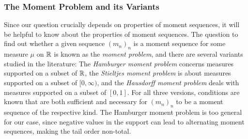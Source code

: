 \documentclass[a4paper]{scrreprt}
\begin{document}
    \subsubsection{The Moment Problem and its Variants}
    Since our question crucially depends on properties of moment sequences, it will be helpful to know about the properties of moment sequences.
    The question to find out whether a given sequence $(m_n)_n$ is a moment sequence for some measure $\mu$ on $\mathbb{R}$ is known as the \emph{moment problem}, and there are several variants studied in the literature:
    The \emph{Hamburger moment problem} concerns measures supported on a subset of $\mathbb{R}$, the \emph{Stieltjes moment problem} is about measures supported on a subset of $[0, \infty)$,
    and the \emph{Hausdorff moment problem} deals with measures supported on a subset of $[0, 1]$. For all three versions, conditions are known that are both sufficient and necessary for $(m_n)_n$ to be a moment sequence of the respective kind.
    The Hamburger moment problem is too general for our case, since negative values in the support can lead to alternating moment sequences, making the tail order non-total.
%    
\end{document}
